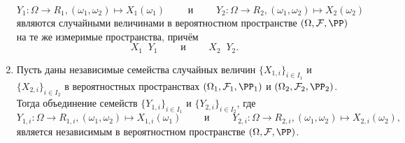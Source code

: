\documentclass[12pt,a4paper]{article}
\newcommand{\Deq}{\mathop{\stackrel{\mathcal{D}}{=}}}
\begin{document}
\begin{theorem}
\begin{enumerate}
                \[Y_1: \Omega \to R_1, (\omega_1, \omega_2) \mapsto X_1(\omega_1) \qquad \text{ и } \qquad Y_2: \Omega \to R_2, (\omega_1, \omega_2) \mapsto X_2(\omega_2)\]
                являются случайными величинами в вероятностном пространстве $(\Omega, \mathcal{F}, \PP)$ на те же измеримые пространства, причём
                \[X_1 \Deq Y_1 \qquad \text{ и } \qquad X_2 \Deq Y_2.\]
            \item Пусть даны независимые семейства случайных величин $\{X_{1,i}\}_{i \in I_1}$ и $\{X_{2, i}\}_{i \in I_2}$ в вероятностных пространствах $(\Omega_1, \mathcal{F}_1, \PP_1)$ и $(\Omega_2, \mathcal{F}_2, \PP_2)$. Тогда объединение семейств $\{Y_{1, i}\}_{i \in I_1}$ и $\{Y_{2, i}\}_{i \in I_2}$, где
                \[Y_{1, i}: \Omega \to R_{1, i}, (\omega_1, \omega_2) \mapsto X_{1, i}(\omega_1) \qquad \text{ и } \qquad Y_{2, i}: \Omega \to R_{2, i}, (\omega_1, \omega_2) \mapsto X_{2, i}(\omega_2),\]
                является независимым в вероятностном пространстве $(\Omega, \mathcal{F}, \PP)$.
        \end{enumerate}
    \end{theorem}
\end{document}

